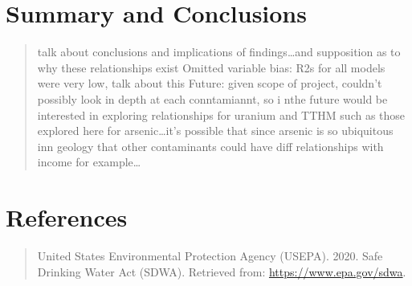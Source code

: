 \documentclass[12pt,]{article}
\begin{document}
\newpage

\hypertarget{summary-and-conclusions}{%
\section{Summary and Conclusions}\label{summary-and-conclusions}}

\begin{quote}
talk about conclusions and implications of findings\ldots{}and
supposition as to why these relationships exist Omitted variable bias:
R2s for all models were very low, talk about this Future: given scope of
project, couldn't possibly look in depth at each conntamiannt, so i nthe
future would be interested in exploring relationships for uranium and
TTHM such as those explored here for arsenic\ldots{}it's possible that
since arsenic is so ubiquitous inn geology that other contaminants could
have diff relationships with income for example\ldots{}
\end{quote}

\newpage

\hypertarget{references}{%
\section{References}\label{references}}

\begin{quote}
United States Environmental Protection Agency (USEPA). 2020. Safe
Drinking Water Act (SDWA). Retrieved from:
\url{https://www.epa.gov/sdwa}.
\end{quote}
\end{document}
